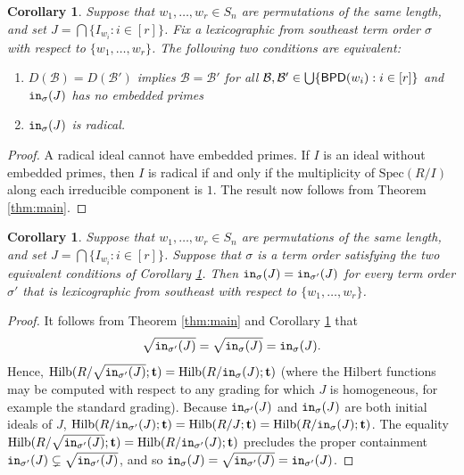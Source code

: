 \documentclass[12pt,reqno]{amsart}
\newtheorem{corollary}[theorem]{Corollary}
\newtheorem{Main Conjecture}[theorem]{Main Conjecture}
\theoremstyle{remark}
\theoremstyle{plain}
\newcommand{\init}{{\tt in}}
\newcommand{\bpd}{{\sf BPD}}
\newcommand{\hilb}{\mbox{Hilb}}
\newcommand{\spec}{{\mbox{Spec}}}
\begin{document}
\begin{corollary}\label{cor:reduced}
Suppose that $w_1, \ldots, w_r \in S_n$ are permutations of the same  length, and set 
$J = \bigcap\{ I_{w_i}:i \in [r]\}$.
Fix a lexicographic from southeast term order $\sigma$ with respect to $\{w_1, \ldots, w_r\}$.
The following two conditions are equivalent:
\begin{enumerate}
    \item $D(\mathcal{B}) = D(\mathcal{B}')$ implies $\mathcal{B} = \mathcal{B}'$ for all 
    $\mathcal{B}, \mathcal{B}' \in \bigcup\{ \bpd(w_i):i \in [r]\}$
    and $\init_\sigma(J)$ has no embedded primes
    \item $\init_\sigma(J)$ is radical.
\end{enumerate}
\end{corollary}
\begin{proof}
A radical ideal cannot have embedded primes.  If $I$ is an ideal without embedded primes, then $I$ is radical if and only if the multiplicity of $\spec(R/I)$ along each irreducible component is $1$.  The result now follows from Theorem \ref{thm:main}.
\end{proof}

\begin{corollary}\label{cor:uniqueDiag}
Suppose that $w_1, \ldots, w_r \in S_n$ are permutations of the same  length, and set 
$J = \bigcap\{ I_{w_i}:i \in [r]\}$.
Suppose that $\sigma$ is a term order satisfying the two equivalent conditions of Corollary \ref{cor:reduced}.  Then $\init_{\sigma}(J) = \init_{\sigma'}(J)$ for every term order $\sigma'$ that is lexicographic from southeast with respect to $\{w_1, \ldots, w_r\}$.
\end{corollary}
\begin{proof}
It follows from Theorem \ref{thm:main} and Corollary \ref{cor:reduced} that \[
\sqrt{\init_{\sigma'}(J)} = \sqrt{\init_{\sigma}(J)} = \init_{\sigma}(J).
\] Hence, $\hilb(R/\sqrt{\init_{\sigma'}(J)};\mathbf t) = \hilb(R/\init_{\sigma}(J);\mathbf t)$ (where the Hilbert functions may be computed with respect to any grading 
for which $J$ is homogeneous, for example the standard grading). Because $\init_{\sigma'}(J)$ and $\init_{\sigma}(J)$ are both initial ideals of $J$, $ \hilb(R/\init_{\sigma'}(J);\mathbf t) = \hilb(R/J;\mathbf t) =\hilb(R/\init_{\sigma}(J);\mathbf t)$.  The equality $\hilb(R/\sqrt{\init_{\sigma'}(J)};\mathbf t) = \hilb(R/\init_{\sigma'}(J);\mathbf t)$ precludes the proper containment $\init_{\sigma'}(J) \subsetneq \sqrt{\init_{\sigma'}(J)}$, and so $\init_{\sigma}(J) = \sqrt{\init_{\sigma'}(J)}=\init_{\sigma'}(J)$.
\end{proof}
\end{document}

